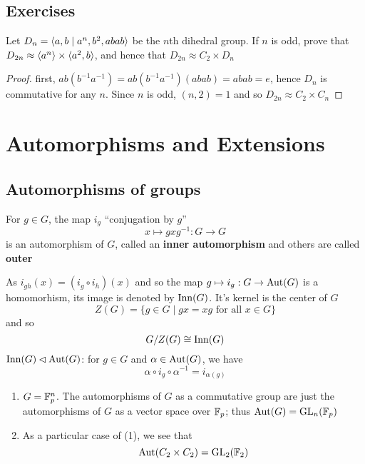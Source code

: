 \documentclass[11pt]{article}
\begin{document}
\label{SKIP2}
\subsection{Exercises}
\label{sec:org70b5191}
\begin{exercise}
\label{ex2.1}
Let \(D_n=\langle a,b\mid a^n,b^2,abab\rangle\) be the \(n\)th dihedral group. If \(n\) is odd, prove
that \(D_{2n}\approx\langle a^n\rangle\times\langle a^2,b\rangle\), and hence that \(D_{2n}\approx C_2\times D_n\)
\end{exercise}

\begin{proof}
first, \(ab(b^{-1}a^{-1})=ab(b^{-1}a^{-1})(abab)=abab=e\), hence \(D_n\) is commutative for
any \(n\). Since \(n\) is odd, \((n,2)=1\) and so \(D_{2n}\approx C_2\times C_{n}\)
\end{proof}
\section{Automorphisms and Extensions}
\label{sec:orged5228c}
\subsection{Automorphisms of groups}
\label{sec:org024d015}
For \(g\in G\), the map \(i_g\) ``conjugation by \(g\)''
\begin{equation*}
x\mapsto gxg^{-1}:G\to G
\end{equation*}
is an automorphism of \(G\), called an \textbf{inner automorphism} and others are called \textbf{outer}

As \(i_{gh}(x)=(i_g\circ i_h)(x)\) and so the map \(g\mapsto i_g:G\to\operatorname{\text{Aut}}(G)\) is a homomorhism, its image
is denoted by \(\operatorname{Inn}(G)\). It's kernel is the center of \(G\)
\begin{equation*}
Z(G)=\{g\in G\mid gx=xg\text{ for all }x\in G\}
\end{equation*}
and so
\begin{equation*}
G/Z(G)\cong\operatorname{Inn}(G)
\end{equation*}
\(\operatorname{Inn}(G)\lhd\operatorname{\text{Aut}}(G)\): for \(g\in G\) and \(\alpha\in\operatorname{\text{Aut}}(G)\), we have
\begin{equation*}
\alpha\circ i_g\circ\alpha^{-1}=i_{\alpha(g)}
\end{equation*}
\begin{examplle}[]
\begin{enumerate}
\item \(G=\mathbb{F}_p^n\). The automorphisms of \(G\) as a commutative group are just the automorphisms
of \(G\) as a vector space over \(\mathbb{F}_p\); thus \(\operatorname{\text{Aut}}(G)=\operatorname{GL}_n(\mathbb{F}_p)\)
\item As a particular case of (1), we see that
\begin{equation*}
\operatorname{\text{Aut}}(C_2\times C_2)=\operatorname{GL}_2(\mathbb{F}_2)
\end{equation*}
\end{enumerate}
\end{examplle}
\end{document}
